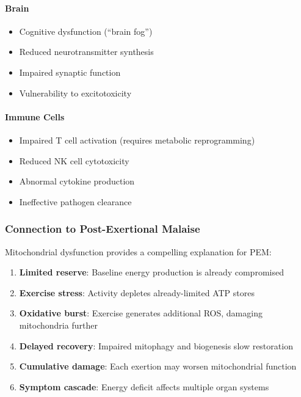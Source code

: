 \paragraph{Brain}
\begin{itemize}
    \item Cognitive dysfunction (``brain fog'')
    \item Reduced neurotransmitter synthesis
    \item Impaired synaptic function
    \item Vulnerability to excitotoxicity
\end{itemize}

\paragraph{Immune Cells}
\begin{itemize}
    \item Impaired T cell activation (requires metabolic reprogramming)
    \item Reduced NK cell cytotoxicity
    \item Abnormal cytokine production
    \item Ineffective pathogen clearance
\end{itemize}

\subsubsection{Connection to Post-Exertional Malaise}

Mitochondrial dysfunction provides a compelling explanation for PEM:

\begin{enumerate}
    \item \textbf{Limited reserve}: Baseline energy production is already compromised
    \item \textbf{Exercise stress}: Activity depletes already-limited ATP stores
    \item \textbf{Oxidative burst}: Exercise generates additional ROS, damaging mitochondria further
    \item \textbf{Delayed recovery}: Impaired mitophagy and biogenesis slow restoration
    \item \textbf{Cumulative damage}: Each exertion may worsen mitochondrial function
    \item \textbf{Symptom cascade}: Energy deficit affects multiple organ systems
\end{enumerate}

